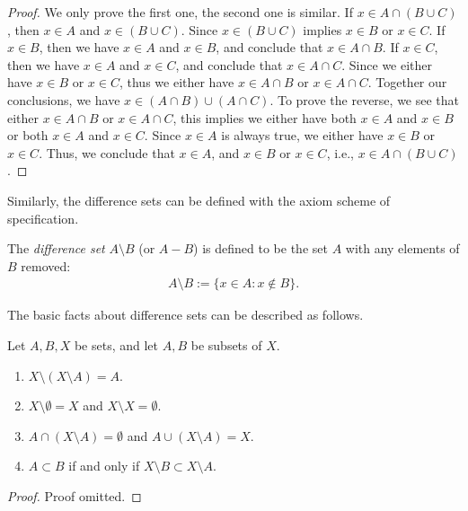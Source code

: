 \begin{proof}
    We only prove the first one, the second one is similar. If $x \in A \cap (B \cup C)$, then $x \in A$ and $x \in (B \cup C)$. Since $x \in (B \cup C)$ implies $x \in B$ or $x \in C$. If $x \in B$, then we have $x \in A$ and $x \in B$, and conclude that $x \in A \cap B$. If $x \in C$, then we have $x \in A$ and $x \in C$, and conclude that $x \in A \cap C$. Since we either have $x \in B$ or $x \in C$, thus we either have $x \in A \cap B$ or $x \in A \cap C$. Together our conclusions, we have $x \in (A \cap B) \cup (A \cap C)$. To prove the reverse, we see that either $x \in A \cap B$ or $x \in A \cap C$, this implies we either have both $x \in A$ and $x \in B$ or both $x \in A$ and $x \in C$. Since $x \in A$ is always true, we either have $x \in B$ or $x \in C$. Thus, we conclude that $x \in A$, and $x \in B$ or $x \in C$, i.e., $x \in A \cap (B \cup C)$.
\end{proof}

Similarly, the difference sets can be defined with the axiom scheme of specification.

\begin{definition}
    The \emph{difference set} $A \setminus B$ (or $A - B$) is defined to be the set $A$ with any elements of $B$ removed:
    \begin{align*}
        A \setminus B := \{x \in A : x \notin B\}.
    \end{align*}
\end{definition}

The basic facts about difference sets can be described as follows.

\begin{proposition}
    Let $A, B, X$ be sets, and let $A, B$ be subsets of $X$.
    \begin{enumerate}
        \item $X \setminus (X \setminus A) = A$.
        \item $X \setminus \emptyset = X$ and $X \setminus X = \emptyset$.
        \item $A \cap (X \setminus A) = \emptyset$ and $A \cup (X \setminus A) = X$.
        \item $A \subset B$ if and only if $X \setminus B \subset X \setminus A$.
    \end{enumerate}
\end{proposition}

\begin{proof}
    Proof omitted.
\end{proof}

